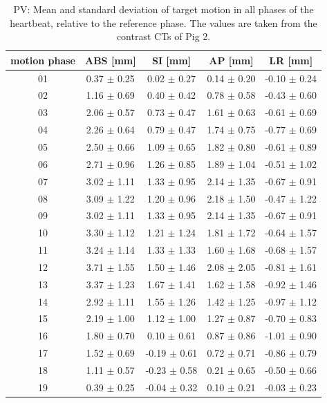 \documentclass[type=dr, dr=rernat, accentcolor=tud7b,colorbacktitle, bigchapter, openright, twoside, 12pt ]{tudthesis}
\begin{document}


\begin{table}[H]
  \centering
  \scriptsize
  \caption{PV: Mean and standard deviation of target motion in all phases of the heartbeat, relative to the reference phase. The values are 
  taken from the contrast CTs of Pig 2.}
  \begin{tabular}{|c|c|c|c|c|}
    \hline\hline
    motion phase\rule{0pt}{2.6ex}\rule[-1.2ex]{0pt}{0pt} & ABS [mm] & SI [mm] & AP [mm] & LR [mm]\\
    \hline
01 &0.37 $\pm$ 0.25 &0.02 $\pm$ 0.27 &0.14 $\pm$ 0.20 &-0.10 $\pm$ 0.24 \\
02 &1.16 $\pm$ 0.69 &0.40 $\pm$ 0.42 &0.78 $\pm$ 0.58 &-0.43 $\pm$ 0.60 \\
03 &2.06 $\pm$ 0.57 &0.73 $\pm$ 0.47 &1.61 $\pm$ 0.63 &-0.61 $\pm$ 0.69 \\
04 &2.26 $\pm$ 0.64 &0.79 $\pm$ 0.47 &1.74 $\pm$ 0.75 &-0.77 $\pm$ 0.69 \\
05 &2.50 $\pm$ 0.66 &1.09 $\pm$ 0.65 &1.82 $\pm$ 0.80 &-0.61 $\pm$ 0.89 \\
06 &2.71 $\pm$ 0.96 &1.26 $\pm$ 0.85 &1.89 $\pm$ 1.04 &-0.51 $\pm$ 1.02 \\
07 &3.02 $\pm$ 1.11 &1.33 $\pm$ 0.95 &2.14 $\pm$ 1.35 &-0.67 $\pm$ 0.91 \\
08 &3.09 $\pm$ 1.22 &1.20 $\pm$ 0.96 &2.18 $\pm$ 1.50 &-0.47 $\pm$ 1.22 \\
09 &3.02 $\pm$ 1.11 &1.33 $\pm$ 0.95 &2.14 $\pm$ 1.35 &-0.67 $\pm$ 0.91 \\
10 &3.30 $\pm$ 1.12 &1.21 $\pm$ 1.24 &1.81 $\pm$ 1.72 &-0.64 $\pm$ 1.57 \\
11 &3.24 $\pm$ 1.14 &1.33 $\pm$ 1.33 &1.60 $\pm$ 1.68 &-0.68 $\pm$ 1.57 \\
12 &3.71 $\pm$ 1.55 &1.50 $\pm$ 1.46 &2.08 $\pm$ 2.05 &-0.81 $\pm$ 1.61 \\
13 &3.37 $\pm$ 1.23 &1.67 $\pm$ 1.41 &1.62 $\pm$ 1.58 &-0.92 $\pm$ 1.46 \\
14 &2.92 $\pm$ 1.11 &1.55 $\pm$ 1.26 &1.42 $\pm$ 1.25 &-0.97 $\pm$ 1.12 \\
15 &2.19 $\pm$ 1.00 &1.12 $\pm$ 1.00 &1.27 $\pm$ 0.87 &-0.70 $\pm$ 0.83 \\
16 &1.80 $\pm$ 0.70 &0.10 $\pm$ 0.61 &0.87 $\pm$ 0.86 &-1.01 $\pm$ 0.90 \\
17 &1.52 $\pm$ 0.69 &-0.19 $\pm$ 0.61 &0.72 $\pm$ 0.71 &-0.86 $\pm$ 0.79 \\
18 &1.11 $\pm$ 0.57 &-0.23 $\pm$ 0.58 &0.21 $\pm$ 0.65 &-0.50 $\pm$ 0.66 \\
19 &0.39 $\pm$ 0.25 &-0.04 $\pm$ 0.32 &0.10 $\pm$ 0.21 &-0.03 $\pm$ 0.23 \\
    \hline\hline
  \end{tabular}
  \label{tab:motion:PV:Pig2}
\end{table}
\end{document}
